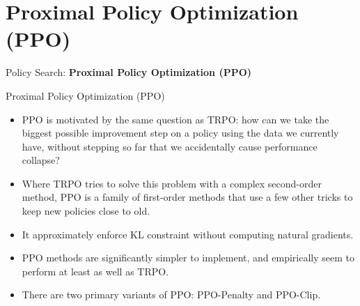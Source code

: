 \section{Proximal Policy Optimization (PPO)}
\begin{frame}{}
    \LARGE Policy Search: \textbf{Proximal Policy Optimization (PPO)}
\end{frame}

\begin{frame}{Proximal Policy Optimization (PPO)}
\begin{itemize}
    \item PPO is motivated by the same question as TRPO: how can we take the biggest possible improvement step on a policy using the data we currently have, without stepping so far that we accidentally cause performance collapse?
    \item Where TRPO tries to solve this problem with a complex second-order method, PPO is a family of first-order methods that use a few other tricks to keep new policies close to old. 
    \item It approximately enforce KL constraint without computing natural gradients.
    \item PPO methods are significantly simpler to implement, and empirically seem to perform at least as well as TRPO.
    \item There are two primary variants of PPO: PPO-Penalty and PPO-Clip.
    
\end{itemize}
    
\end{frame}

